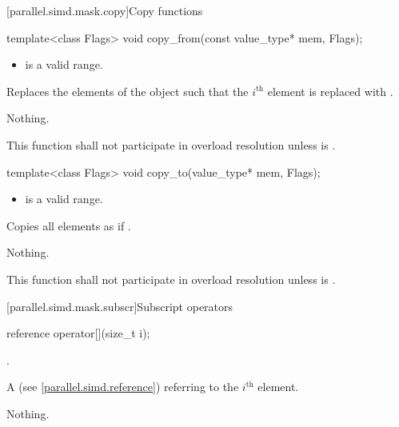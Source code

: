 [parallel.simd.mask.copy]{Copy functions}

\begin{itemdecl}
template<class Flags> void copy_from(const value_type* mem, Flags);
\end{itemdecl}

\begin{itemdescr}
  \pnum\requires
  \begin{itemize}
    \item \tcode{[mem, mem + size())} is a valid range.
  \end{itemize}

  \pnum\effects
  Replaces the elements of the  object such that the $i^\text{th}$ element is replaced with  \foralli.

  \pnum\throws Nothing.

  \pnum\remarks
  This function shall not participate in overload resolution unless  is .

\end{itemdescr}

\begin{itemdecl}
template<class Flags> void copy_to(value_type* mem, Flags);
\end{itemdecl}

\begin{itemdescr}
  \pnum\requires
  \begin{itemize}
    \item \tcode{[mem, mem + size())} is a valid range.
  \end{itemize}

  \pnum\effects
  Copies all  elements as if  \foralli.

  \pnum\throws Nothing.

  \pnum\remarks
  This function shall not participate in overload resolution unless  is .
\end{itemdescr}

[parallel.simd.mask.subscr]{Subscript operators}

\begin{itemdecl}
reference operator[](size_t i);
\end{itemdecl}

\begin{itemdescr}
  \pnum\requires
  .

  \pnum\returns
  A  (see \ref{parallel.simd.reference}) referring to the $i^\text{th}$ element.

  \pnum\throws Nothing.
\end{itemdescr}

